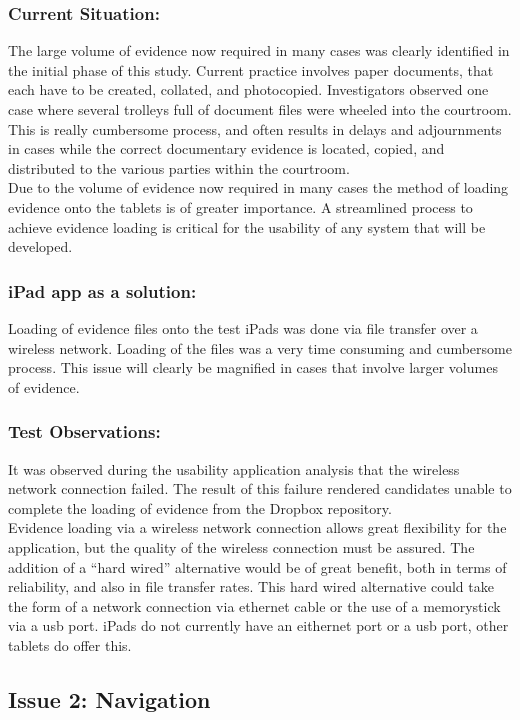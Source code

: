  \subsubsection{Current Situation:}
The large volume of evidence now required in many cases was clearly identified in the initial phase of this study. Current practice involves paper documents, that each have to be created, collated, and photocopied. Investigators observed one case where several trolleys full of document files were wheeled into the courtroom. This is really cumbersome process, and often results in delays and adjournments in cases while the correct documentary evidence is located, copied, and distributed to the various parties within the courtroom.\\
Due to the volume of evidence now required in many cases the method of loading evidence onto the tablets is of greater importance. A streamlined process to achieve evidence loading is critical for the usability of any system that will be developed.\\
\subsubsection{iPad app as a solution:}
Loading of evidence files onto the test iPads was done via file transfer over a wireless network. Loading of the files was a very time consuming and cumbersome process. This issue will clearly be magnified in cases that involve larger volumes of evidence.\\
\subsubsection{Test Observations:}
It was observed during the usability application analysis that the wireless network connection failed. The result of this failure rendered candidates unable to complete the loading of evidence from the Dropbox repository.\\
Evidence loading via a wireless network connection allows great flexibility for the application, but the quality of the wireless connection must be assured. The addition of a ``hard wired'' alternative would be of great benefit, both in terms of reliability, and also in file transfer rates. This hard wired alternative could take the form of a network connection via ethernet cable or the use of a memorystick via a usb port. iPads do not currently have an eithernet port or a usb port, other tablets do offer this.\\
\subsection{Issue 2: Navigation}
